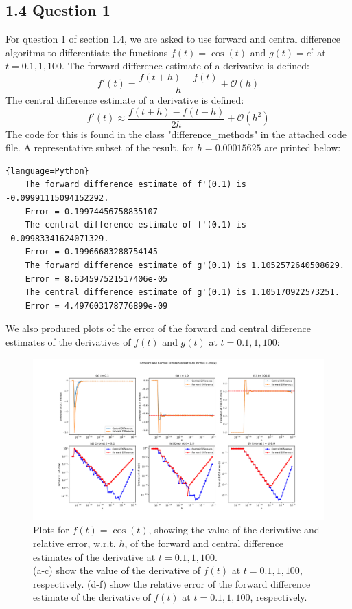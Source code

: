 \documentclass{article}
\theoremstyle{definition}
\theoremstyle{remark}
\begin{document}
\subsection{1.4 Question 1}
For question 1 of section 1.4, we are asked to use forward and central difference algoritms to differentiate the functions $f(t) = \cos(t)$ and $g(t) = e^t$ at $t = 0.1, 1, 100$. The forward difference estimate of a derivative is defined:
\begin{equation}
    f'(t) = \frac{f(t+h) - f(t)}{h} + \mathcal{O}(h)
\end{equation}
The central difference estimate of a derivative is defined:
\begin{equation}
    f'(t) \approx \frac{f(t+h) - f(t-h)}{2h} + \mathcal{O}(h^2)
\end{equation}
The code for this is found in the class "difference\_methods" in the attached code file. A representative subset of the result, for $h=0.00015625$ are printed below:
\begin{lstlisting}{language=Python}
    The forward difference estimate of f'(0.1) is -0.09991115094152292.
    Error = 0.19974456758835107
    The central difference estimate of f'(0.1) is -0.09983341624071329.
    Error = 0.19966683288754145
    The forward difference estimate of g'(0.1) is 1.1052572640508629.
    Error = 8.634597521517406e-05
    The central difference estimate of g'(0.1) is 1.105170922573251.
    Error = 4.497603178776899e-09
\end{lstlisting}
We also produced plots of the error of the forward and central difference estimates of the derivatives of $f(t)$ and $g(t)$ at $t=0.1, 1, 100$:
\begin{figure}[H]
    \centering
    \includegraphics[width=1.2\textwidth]{DifferenceMethodsCos.pdf}
    \caption{\label{fig:DifferenceMethods} Plots for $f(t) = \cos(t)$, showing the value of the derivative and relative error, w.r.t. $h$, of the forward and central difference estimates of the derivative at $t=0.1, 1, 100$.\\
    \indent (a-c) show the value of the derivative of $f(t)$ at $t=0.1, 1, 100$, respectively. (d-f) show the relative error of the forward difference estimate of the derivative of $f(t)$ at $t=0.1, 1, 100$, respectively.}
\end{figure}
\end{document}
